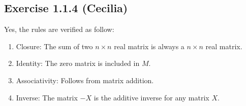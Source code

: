\subsection*{Exercise 1.1.4 (Cecilia)}

Yes, the rules are verified as follow:

\begin{enumerate}
    \item{Closure: The sum of two $ n \times n $ real matrix is always a $ n \times n $ real matrix.}
    \item{Identity: The zero matrix is included in $ M $.}
    \item{Associativity: Follows from matrix addition.}
    \item{Inverse: The matrix $-X$ is the additive inverse for any matrix $X$.}
\end{enumerate}
